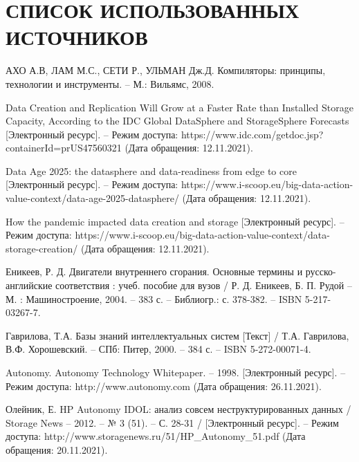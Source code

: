 \section*{СПИСОК ИСПОЛЬЗОВАННЫХ ИСТОЧНИКОВ}

\begingroup
\renewcommand{\section}[2]{}
\begin{thebibliography}{}
	 АХО А.В, ЛАМ М.С., СЕТИ Р., УЛЬМАН Дж.Д. Компиляторы: принципы, технологии и инструменты. – М.: Вильямс, 2008.
	
	 Data Creation and Replication Will Grow at a Faster Rate than Installed Storage Capacity, According to the IDC Global DataSphere and StorageSphere Forecasts [Электронный ресурс]. -- Режим доступа: https://www.idc.com/getdoc.jsp?containerId=prUS47560321 (Дата обращения: 12.11.2021).
	
	 Data Age 2025: the datasphere and data-readiness from edge to core [Электронный ресурс]. -- Режим доступа: https://www.i-scoop.eu/big-data-action-value-context/data-age-2025-datasphere/ (Дата обращения: 12.11.2021).
	
	 How the pandemic impacted data creation and storage [Электронный ресурс]. -- Режим доступа: https://www.i-scoop.eu/big-data-action-value-context/data-storage-creation/ (Дата обращения: 12.11.2021).
	
	 Еникеев, Р. Д. Двигатели внутреннего сгорания. Основные термины и русско-английские соответствия : учеб. пособие для вузов / Р. Д. Еникеев, Б. П. Рудой -- М. : Машиностроение, 2004. -- 383 с. -- Библиогр.: с. 378-382. -- ISBN 5-217-03267-7.
	
	 Гаврилова, Т.А. Базы знаний интеллектуальных систем [Текст] / Т.А. Гаврилова, В.Ф. Хорошевский. -- СПб: Питер, 2000. -- 384 с. -- ISBN 5-272-00071-4.
	
	 Autonomy. Autonomy Technology Whitepaper. -- 1998. [Электронный ресурс]. -- Режим доступа: http://www.autonomy.com (Дата обращения: 26.11.2021).
	
	 Олейник, Е. HP Autonomy IDOL: анализ совсем неструктурированных данных / Storage News --  2012. -- № 3 (51). -- С. 28-31 / [Электронный ресурс]. -- Режим доступа: http://www.storagenews.ru/51/HP\_Autonomy\_51.pdf (Дата обращения: 20.11.2021).
	

\end{thebibliography}

